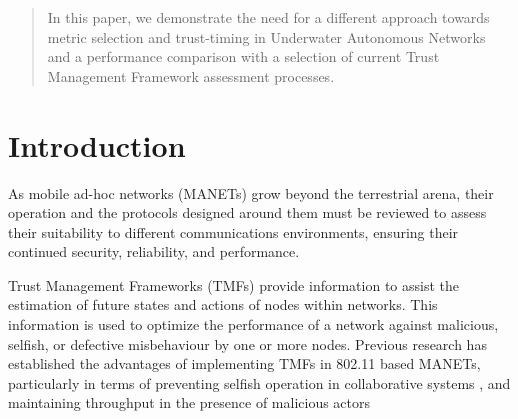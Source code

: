 \documentclass[conference]{IEEEtran}
\begin{document}
\maketitle


\begin{abstract}
In this paper, we demonstrate the need for a different approach towards metric selection and trust-timing in Underwater Autonomous Networks and a performance comparison with a selection of current Trust Management Framework assessment processes.

\end{abstract}





%
\IEEEpeerreviewmaketitle



\section{Introduction}\label{sec:introduction}

As mobile ad-hoc networks (MANETs) grow beyond the terrestrial arena, their operation and the protocols designed around them must be reviewed to assess their suitability to different communications environments, ensuring their continued security, reliability, and performance.

Trust Management Frameworks (TMFs) provide information to assist the estimation of future states and actions of nodes within networks.
This information is used to optimize the performance of a network against malicious, selfish, or defective misbehaviour by one or more nodes.
Previous research has established the advantages of implementing TMFs in 802.11 based MANETs, particularly in terms of preventing selfish operation in collaborative systems \cite{Li2007}, and maintaining throughput in the presence of malicious actors \cite{Buchegger2002}
\end{document}
